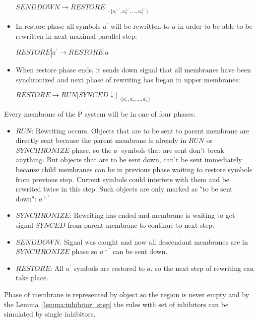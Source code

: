 \documentclass[a4paper,10pt]{article}
\begin{document}
\begin{dokaz}
\begin{itemize}
    $SENDDOWN \rightarrow RESTORE|_{\neg \{a_1^{\downarrow\prime}, a_n^{\downarrow\prime}, \dots, a_n^{\downarrow\prime}\}}$

    \item In restore phase all symbols $a^{\prime}$ will be rewritten to $a$ in order to be able to be rewritten in next maximal parallel step:

    $RESTORE|a^{\prime} \rightarrow RESTORE|a$

    \item When restore phase ends, it sends down signal that all membranes have been synchronized and next phase of rewriting has began in upper membranes:

    $RESTORE \rightarrow RUN|SYNCED\downarrow|_{\neg \{a_1^{\prime}, a_2^{\prime}, \dots, a_n^{\prime}\}}$
  \end{itemize}

  Every membrane of the P system will be in one of four phases:
  \begin{itemize}
    \item $RUN$: Rewriting occurs. Objects that are to be sent to parent membrane are directly sent because the parent membrane is already in $RUN$ or $SYNCHRONIZE$ phase, so the $a^{\prime}$ symbols that are sent don't break anything. But objects that are to be sent down, can't be sent immediately because child membranes can be in previous phase waiting to restore symbols from previous step. Current symbols could interfere with them and be rewrited twice in this step. Such objects are only marked as "to be sent down": $a^{\downarrow\prime}$

    \item $SYNCHRONIZE$: Rewriting has ended and membrane is waiting to get signal $SYNCED$ from parent membrane to continue to next step.

    \item $SENDDOWN$: Signal was caught and now all descendant membranes are in $SYNCHRONIZE$ phase so $a^{\downarrow\prime}$ can be sent down.

    \item $RESTORE$: All $a^{\prime}$ symbols are restored to $a$, so the next step of rewriting can take place.
  \end{itemize}

  Phase of membrane is represented by object so the region is never empty and by the Lemma~\ref{lemma:inhibitor_step} the rules with set of inhibitors can be simulated by single inhibitors.
\end{dokaz}
\end{document}
